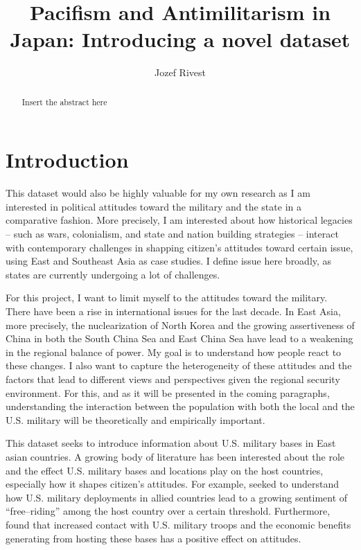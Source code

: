 \documentclass[12pt]{article}
\title{Pacifism and Antimilitarism in Japan: Introducing a novel
dataset}
\author{Jozef Rivest}
\date{ }
\begin{document}
\maketitle

\begin{abstract}
  Insert the abstract here
\end{abstract}

\section{Introduction}


This dataset would also be highly valuable for my own research as
I am interested in political attitudes toward the military and the
state in a comparative fashion. More precisely, I am interested
about how historical legacies -- such as wars, colonialism, and
state and nation building strategies -- interact with contemporary
challenges in shapping citizen's attitudes toward certain issue,
using East and Southeast Asia as case studies. I define issue here
broadly, as states are currently undergoing a lot of challenges.

For this project, I want to limit myself to the attitudes toward
the military. There have been a rise in international issues for
the last decade. In East Asia, more precisely, the nuclearization
of North Korea and the growing assertiveness of China in both the
South China Sea and East China Sea have lead to a weakening in the
regional balance of power. My goal is to understand how people react
to these changes. I also want to capture the heterogeneity of these 
attitudes and the factors that lead to different views and perspectives 
given the regional security environment. For this, and as it will 
be presented in the coming paragraphs, understanding the interaction 
between the population with both the local and the U.S. military 
will be theoretically and empirically important. 

This dataset seeks to introduce information about U.S. military
bases in East asian countries. A growing body of literature has
been interested about the role and the effect U.S. military bases
and locations play on the host countries, especially how it shapes
citizen's attitudes.  For example, \cite{jakobsen_jakobsen19} seeked
to understand how U.S. military deployments in allied countries
lead to a growing sentiment of ``free--riding'' among the host
country over a certain threshold. Furthermore, \cite{allen_etal20}
found that increased contact with U.S. military troops and the
economic benefits generating from hosting these bases has a positive
effect on attitudes.
\end{document}
